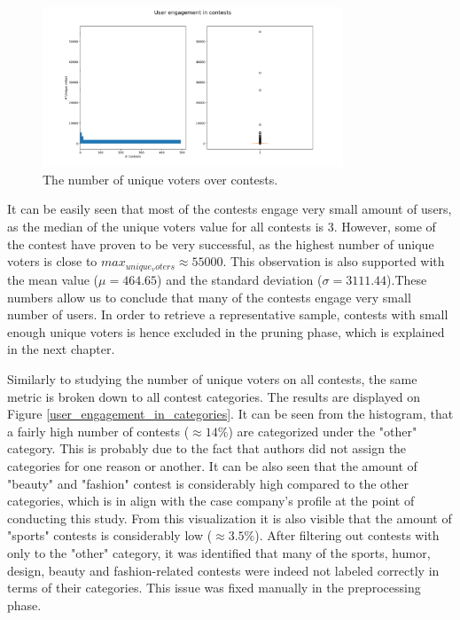         \begin{figure}[h] 
            \begin{center}
                \includegraphics[width=0.8\textwidth]{Images/user_engagement_in_contests.png}
                \caption{The number of unique voters over contests.}
                \label{user_engagement_in_contests}
            \end{center}
        \end{figure}

        It can be easily seen that most of the contests engage very small amount of users, as the median of the unique voters value for all contests is 3. However, some of the contest have proven to be very successful, as the highest number of unique voters is close to $max_{unique_voters} \approx 55 000$. This observation is also supported with the mean value ($\mu = 464.65$) and the standard deviation ($\sigma = 3111.44$).These numbers allow us to conclude that many of the contests engage very small number of users. In order to retrieve a representative sample, contests with small enough unique voters is hence excluded in the pruning phase, which is explained in the next chapter. 
        
        Similarly to studying the number of unique voters on all contests, the same metric is broken down to all contest categories. The results are displayed on Figure \ref{user_engagement_in_categories}. It can be seen from the histogram, that a fairly high number of contests ($\approx 14 \% $) are categorized under the "other" category. This is probably due to the fact that authors did not assign the categories for one reason or another. It can be also seen that the amount of "beauty" and "fashion" contest is considerably high compared to the other categories, which is in align with the case company's profile at the point of conducting this study. From this visualization it is also visible that the amount of "sports" contests is considerably low ($\approx 3.5 \% $). After filtering out contests with only to the "other" category, it was identified that many of the sports, humor, design, beauty and fashion-related contests were indeed not labeled correctly in terms of their categories. This issue was fixed manually in the preprocessing phase. 

